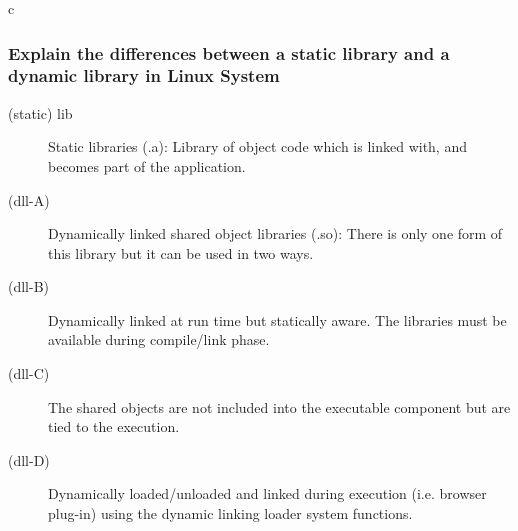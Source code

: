 \documentclass{article}
\begin{document}
\begin{mitned}{c}
\subsubsection{Explain the differences between a static library and a dynamic library in Linux System}
\begin{description}
\item[(static) lib]Static libraries (.a): Library of object code which is linked with, and becomes part of the application.
\item[(dll-A)]Dynamically linked shared object libraries (.so): There is only one form of this library but it can be used in two ways.
\item[(dll-B)]Dynamically linked at run time but statically aware. The libraries must be available during compile/link phase. 
\item[(dll-C)]The shared objects are not included into the executable component but are tied to the execution.
\item[(dll-D)]Dynamically loaded/unloaded and linked during execution (i.e. browser plug-in) using the dynamic linking loader system functions.
\end{description}


\end{mitned}
\end{document}
